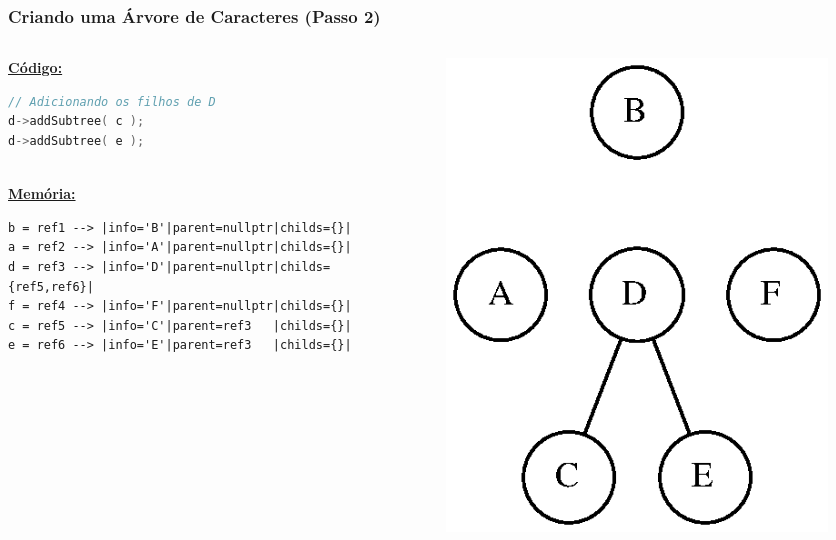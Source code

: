 \documentclass[aspectratio=169]{beamer}
\begin{document}
\begin{frame}[fragile]\frametitle{Criando uma Árvore de Caracteres (Passo 2)}
\begin{columns}[T]
\begin{column}{0.5\linewidth}
\textbf{\underline{Código:}}
\begin{lstlisting}[language=C++,basicstyle=\ttfamily\tiny]
// Adicionando os filhos de D
d->addSubtree( c );
d->addSubtree( e );
\end{lstlisting}
~\\
\textbf{\underline{Memória:}}
{\tiny
\begin{verbatim}
b = ref1 --> |info='B'|parent=nullptr|childs={}|
a = ref2 --> |info='A'|parent=nullptr|childs={}|
d = ref3 --> |info='D'|parent=nullptr|childs={ref5,ref6}|
f = ref4 --> |info='F'|parent=nullptr|childs={}|
c = ref5 --> |info='C'|parent=ref3   |childs={}|
e = ref6 --> |info='E'|parent=ref3   |childs={}|
\end{verbatim}
}
\end{column}
\begin{column}{0.5\linewidth}
\begin{figure}[h]
	\centering
	\includegraphics[height=0.4\paperheight]{imagens/arvore_c-passo2.eps}
\end{figure}
\end{column}
\end{columns}
\end{frame}
\end{document}
